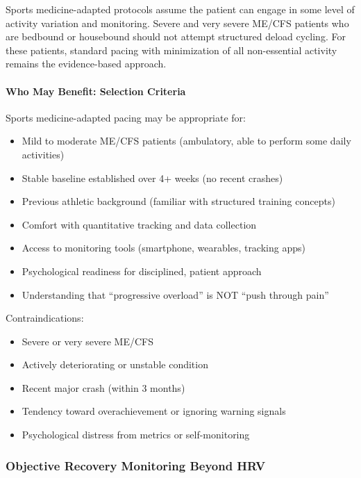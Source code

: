 \begin{warning}
Sports medicine-adapted protocols assume the patient can engage in some level of activity variation and monitoring. Severe and very severe ME/CFS patients who are bedbound or housebound should not attempt structured deload cycling. For these patients, standard pacing with minimization of all non-essential activity remains the evidence-based approach.
\end{warning}

\paragraph{Who May Benefit: Selection Criteria}

Sports medicine-adapted pacing may be appropriate for:
\begin{itemize}
    \item Mild to moderate ME/CFS patients (ambulatory, able to perform some daily activities)
    \item Stable baseline established over 4+ weeks (no recent crashes)
    \item Previous athletic background (familiar with structured training concepts)
    \item Comfort with quantitative tracking and data collection
    \item Access to monitoring tools (smartphone, wearables, tracking apps)
    \item Psychological readiness for disciplined, patient approach
    \item Understanding that ``progressive overload'' is NOT ``push through pain''
\end{itemize}

Contraindications:
\begin{itemize}
    \item Severe or very severe ME/CFS
    \item Actively deteriorating or unstable condition
    \item Recent major crash (within 3 months)
    \item Tendency toward overachievement or ignoring warning signals
    \item Psychological distress from metrics or self-monitoring
\end{itemize}

\subsubsection{Objective Recovery Monitoring Beyond HRV}

